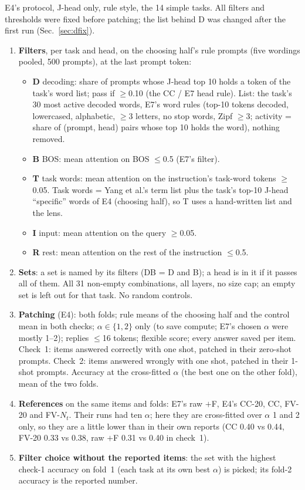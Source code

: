 \documentclass[10pt,a4paper]{article}
\begin{document}
E4's protocol, J-head only, rule style, the 14 simple tasks. All filters and thresholds were fixed before patching; the list behind D was changed after the first run (Sec.~\ref{sec:dfix}).

\begin{enumerate}
\item \textbf{Filters}, per task and head, on the choosing half's rule prompts (five wordings pooled, 500 prompts), at the last prompt token:
  \begin{itemize}
  \item \textbf{D} decoding: share of prompts whose J-head top 10 holds a token of the task's word list; pass if $\geq$0.10 (the CC / E7 head rule). List: the task's 30 most active decoded words, E7's word rules (top-10 tokens decoded, lowercased, alphabetic, $\geq$3 letters, no stop words, Zipf $\geq$3; activity = share of (prompt, head) pairs whose top 10 holds the word), nothing removed.
  \item \textbf{B} BOS: mean attention on BOS $\leq$0.5 (E7's filter).
  \item \textbf{T} task words: mean attention on the instruction's task-word tokens $\geq$0.05. Task words = Yang et al.'s term list plus the task's top-10 J-head ``specific'' words of E4 (choosing half), so T uses a hand-written list and the lens.
  \item \textbf{I} input: mean attention on the query $\geq$0.05.
  \item \textbf{R} rest: mean attention on the rest of the instruction $\leq$0.5.
  \end{itemize}
\item \textbf{Sets}: a set is named by its filters (DB = D and B); a head is in it if it passes all of them. All 31 non-empty combinations, all layers, no size cap; an empty set is left out for that task. No random controls.
\item \textbf{Patching} (E4): both folds; rule means of the choosing half and the control mean in both checks; $\alpha\in\{1,2\}$ only (to save compute; E7's chosen $\alpha$ were mostly 1--2); replies $\leq$16 tokens; flexible score; every answer saved per item. Check~1: items answered correctly with one shot, patched in their zero-shot prompts. Check~2: items answered wrongly with one shot, patched in their 1-shot prompts. Accuracy at the cross-fitted $\alpha$ (the best one on the other fold), mean of the two folds.
\item \textbf{References} on the same items and folds: E7's raw $+$F, E4's CC-20, CC, FV-20 and FV-$N_t$. Their runs had ten $\alpha$; here they are cross-fitted over $\alpha$ 1 and 2 only, so they are a little lower than in their own reports (CC 0.40 vs 0.44, FV-20 0.33 vs 0.38, raw $+$F 0.31 vs 0.40 in check~1).
\item \textbf{Filter choice without the reported items}: the set with the highest check-1 accuracy on fold~1 (each task at its own best $\alpha$) is picked; its fold-2 accuracy is the reported number.
\end{enumerate}
\end{document}
